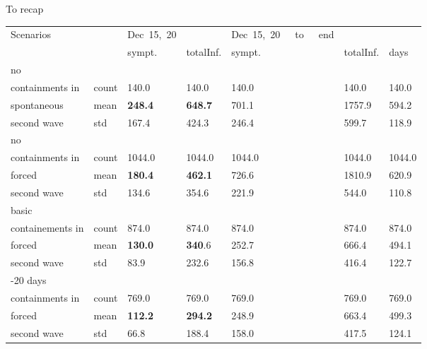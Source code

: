 \documentclass[8pt]{beamer}
\begin{document}
\begin{frame}{To recap}

\begin{table}[H]
\center
\footnotesize
\begin{tabular}{p{1.8cm}p{0.5cm}p{0.5cm}p{0.5cm}p{0.5cm}p{0.5cm}p{0.5cm}}
\toprule
Scenarios     &    &  Dec~15,~20 &               & Dec~15,~20~~~to~~~end  &  &\\
                     &    & sympt.           &  totalInf. &  sympt. &  totalInf.  & days   \\                               

\midrule
no \\
containments in   & count & 140.0 &                      140.0 &                140.0 &                   140.0 &  140.0 \\
spontaneous         &  mean  &  \textbf{248.4} &                      \textbf{648.7} &      701.1 &                  1757.9 &  594.2 \\
second wave         & std  &  167.4 &                      424.3 &               246.4 &                   599.7 &  118.9 \\

\midrule
no \\
containments in   & count &     1044.0 &                     1044.0 &             1044.0 &                  1044.0 & 1044.0 \\
forced         & mean  &       \textbf{180.4} &                      \textbf{462.1} &          726.6 &                  1810.9 &  620.9 \\
second wave         & std   & 134.6 &                      354.6 &           221.9 &                   544.0 &  110.8 \\

\midrule
basic \\
containements in   & count &     874.0 &                      874.0 &          874.0 &                   874.0 &  874.0 \\
forced                    & mean  &             \textbf{130.0} &                      \textbf{340}.6 &                 252.7 &                   666.4 &  494.1 \\
second wave         & std   &   83.9 &                      232.6 &                  156.8 &                   416.4 &  122.7 \\
         
\midrule
-20 days \\ 
containments in   & count &  769.0 &                      769.0 &               769.0 &                   769.0 &  769.0 \\
forced             & mean  &   \textbf{{\color{red}112.2}} &        \textbf{{\color{red} 294.2}} &       248.9 &        663.4 &  499.3 \\
second wave  & std   &   66.8 &                      188.4 &          158.0 &                   417.5 &  124.1 \\


\end{tabular}
\end{table}
\end{frame}
\end{document}
